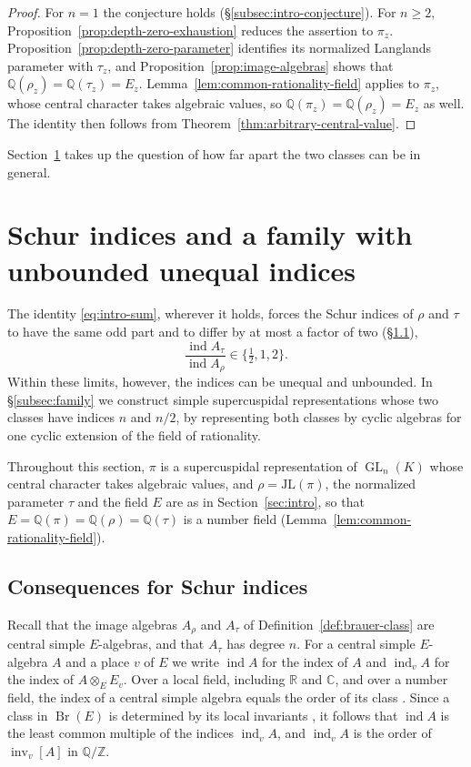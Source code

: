 \documentclass[a4paper,11pt]{amsart}
\theoremstyle{definition}
\theoremstyle{remark}
\numberwithin{equation}{section}
\newcommand{\Q}{\mathbb{Q}}
\newcommand{\Z}{\mathbb{Z}}
\DeclareMathOperator{\Br}{Br}
\DeclareMathOperator{\inv}{inv}
\DeclareMathOperator{\GL}{GL}
\DeclareMathOperator{\ind}{ind}
\newcommand{\R}{\mathbb{R}}
\newcommand{\C}{\mathbb{C}}
\newcommand{\JL}{\mathrm{JL}}
\begin{document}
\begin{proof}
For $n=1$ the conjecture holds (\S\ref{subsec:intro-conjecture}). For $n\ge2$, Proposition~\ref{prop:depth-zero-exhaustion} reduces the assertion to $\pi_z$. Proposition~\ref{prop:depth-zero-parameter} identifies its normalized Langlands parameter with $\tau_z$, and Proposition~\ref{prop:image-algebras} shows that $\Q(\rho_z)=\Q(\tau_z)=E_z$. Lemma~\ref{lem:common-rationality-field} applies to $\pi_z$, whose central character takes algebraic values, so $\Q(\pi_z)=\Q(\rho_z)=E_z$ as well. The identity then follows from Theorem~\ref{thm:arbitrary-central-value}.
\end{proof}

Section~\ref{sec:individual} takes up the question of how far apart the two classes can be in general.

\section{Schur indices and a family with unbounded unequal indices}\label{sec:individual}

The identity \eqref{eq:intro-sum}, wherever it holds, forces the Schur indices of $\rho$ and $\tau$ to have the same odd part and to differ by at most a factor of two (\S\ref{subsec:index-relations}),
\[
 \frac{\ind A_\tau}{\ind A_\rho}\in\bigl\{\tfrac12,1,2\bigr\}.
\]
Within these limits, however, the indices can be unequal and unbounded. In \S\ref{subsec:family} we construct simple supercuspidal representations whose two classes have indices $n$ and $n/2$, by representing both classes by cyclic algebras for one cyclic extension of the field of rationality.

Throughout this section, $\pi$ is a supercuspidal representation of $\GL_n(K)$ whose central character takes algebraic values, and $\rho=\JL(\pi)$, the normalized parameter $\tau$ and the field $E$ are as in Section~\ref{sec:intro}, so that $E=\Q(\pi)=\Q(\rho)=\Q(\tau)$ is a number field (Lemma~\ref{lem:common-rationality-field}).

\subsection{Consequences for Schur indices}\label{subsec:index-relations}

Recall that the image algebras $A_\rho$ and $A_\tau$ of Definition~\ref{def:brauer-class} are central simple $E$-algebras, and that $A_\tau$ has degree $n$. For a central simple $E$-algebra $A$ and a place $v$ of $E$ we write $\ind A$ for the index of $A$ and $\ind_v A$ for the index of $A\otimes_E E_v$. Over a local field, including $\R$ and $\C$, and over a number field, the index of a central simple algebra equals the order of its class \cite[Theorems~1.5.34(iv) and~1.5.36(iv)]{Poo17}. Since a class in $\Br(E)$ is determined by its local invariants \cite[VII, Theorem~7.1]{Mil20}, it follows that $\ind A$ is the least common multiple of the indices $\ind_v A$, and $\ind_v A$ is the order of $\inv_v[A]$ in $\Q/\Z$.
\end{document}
